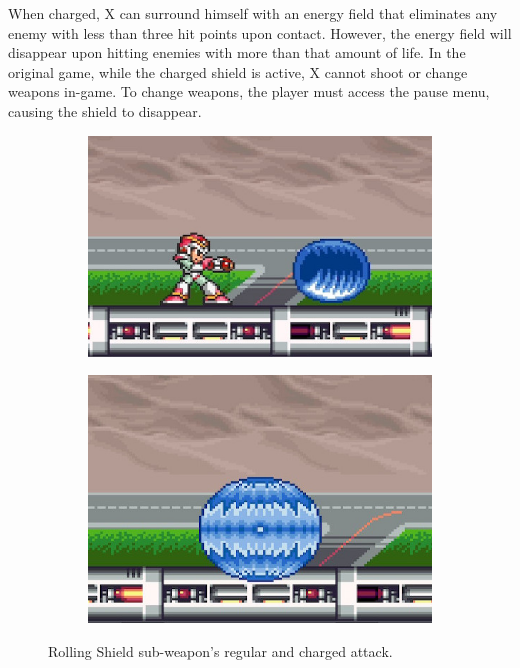 When charged, X can surround himself with an energy field that eliminates any enemy with less than three hit points upon contact. However, the energy field will disappear upon hitting enemies with more than that amount of life. In the original game, while the charged shield is active, X cannot shoot or change weapons in-game. To change weapons, the player must access the pause menu, causing the shield to disappear.

\begin{figure}[htp]
	\centering
	\begin{subfigure}{0.35\linewidth}
		\includegraphics[width=\linewidth]{figures/X1/weapons/Rolling_shield_1.jpg}	
	\end{subfigure}
	\begin{subfigure}{0.3\linewidth}
		\includegraphics[width=\linewidth]{figures/X1/weapons/Rolling_shield_2.jpg}	
	\end{subfigure}
	\caption{Rolling Shield sub-weapon's regular and charged attack.}
\end{figure}

